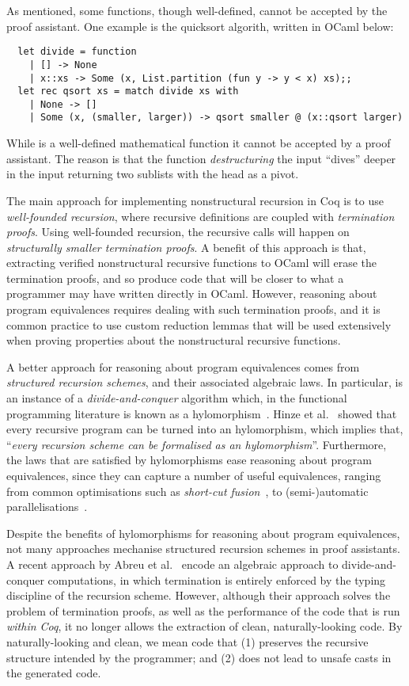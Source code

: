 \documentclass[anonymous, a4paper, UKenglish, cleveref, autoref, thm-restate]{lipics-v2021}
\begin{document}
As mentioned, some functions, though well-defined, cannot be accepted by the
proof assistant. One example is the quicksort algorith, written in OCaml below:
\begin{verbatim}
  let divide = function
    | [] -> None
    | x::xs -> Some (x, List.partition (fun y -> y < x) xs);;
  let rec qsort xs = match divide xs with
    | None -> []
    | Some (x, (smaller, larger)) -> qsort smaller @ (x::qsort larger)
\end{verbatim}
While  is a well-defined mathematical function it cannot be
accepted by a proof assistant.  The reason is that the 
function \emph{destructuring} the input ``dives'' deeper in the input returning
two sublists with the head as a pivot.

The main approach for implementing nonstructural recursion in Coq is to use
\emph{well-founded recursion}, where recursive definitions are coupled with
\emph{termination proofs}. Using well-founded recursion, the recursive calls
will happen on \emph{structurally smaller termination proofs}. A benefit of
this approach is that, extracting verified nonstructural recursive functions to
OCaml will erase the termination proofs, and so produce code that will be
closer to what a programmer may have written directly in OCaml. However,
reasoning about program equivalences requires dealing with such termination
proofs, and it is common practice to use custom reduction lemmas that will be
used extensively when proving properties  about the nonstructural recursive
functions.

A better approach for reasoning about program equivalences comes from
\emph{structured recursion schemes}, and their associated algebraic laws.  In
particular,  is an instance of a \emph{divide-and-conquer}
algorithm which, in the functional programming literature is known as a
hylomorphism~\cite{MeijerFP91, HuIT96}.  Hinze et al.~\cite{HinzeWG15} showed
that every recursive program can be turned into an hylomorphism, which implies
that, ``\emph{every recursion scheme can be formalised as an hylomorphism}''.
Furthermore, the laws that are satisfied by hylomorphisms ease reasoning about
program equivalences, since they can capture a number of useful equivalences,
ranging from common optimisations such as \emph{short-cut
fusion}~\cite{TakanoM95}, to (semi-)automatic
parallelisations~\cite{Gibbons96:Third, farmsCastro}.

Despite the benefits of hylomorphisms for reasoning about program equivalences,
not many approaches mechanise structured recursion schemes in proof assistants.
A recent approach by Abreu et al.~\cite{AbreuDHJMS23} encode an algebraic
approach to divide-and-conquer computations, in which termination is entirely
enforced by the typing discipline of the recursion scheme. However, although
their approach solves the problem of termination proofs, as well as the
performance of the code that is run \emph{within Coq}, it no longer allows the
extraction of clean, naturally-looking code.  By naturally-looking and clean,
we mean code that (1) preserves the recursive structure intended by the
programmer; and (2) does not lead to unsafe casts  in the
generated code. 
\end{document}
